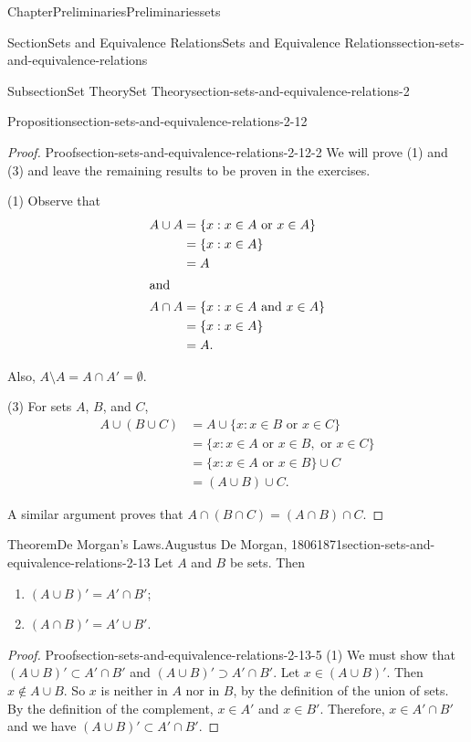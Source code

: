 \documentclass[oneside,10pt,]{book}
\numberwithin{equation}{section}
\begin{document}
\begin{chapterptx}{Chapter}{Preliminaries}{}{Preliminaries}{}{}{sets}
\begin{sectionptx}{Section}{Sets and Equivalence Relations}{}{Sets and Equivalence Relations}{}{}{section-sets-and-equivalence-relations}
\begin{subsectionptx}{Subsection}{Set Theory}{}{Set Theory}{}{}{section-sets-and-equivalence-relations-2}
\begin{proposition}{Proposition}{}{}{section-sets-and-equivalence-relations-2-12}
\begin{enumerate}
\end{enumerate}
%
\end{proposition}
\begin{proof}{Proof}{}{section-sets-and-equivalence-relations-2-12-2}
We will prove (1) and (3) and leave the remaining results to be proven in the exercises.%
\par
(1) Observe that%
\begin{align*}
A \cup A & =  \{ x :  x \in A \text{ or } x \in A \}\\
& =  \{ x : x \in A \}\\
& =  A\\
\intertext{and}
A \cap A & =  \{ x : x \in A \text{ and } x \in A \}\\
& =  \{ x : x \in A  \}\\
& =  A\text{.}
\end{align*}
%
\par
Also, \(A \setminus A = A \cap A' = \emptyset\).%
\par
(3) For sets \(A\), \(B\), and \(C\),%
\begin{align*}
A \cup (B \cup C) & = A \cup \{ x : x \in B \text{ or } x \in C \}\\
& = \{ x : x \in A \text{ or } x \in B, \text{ or } x \in C \}\\
& = \{ x : x \in A \text{ or } x \in B \} \cup C\\
& = (A \cup B) \cup C. 
\end{align*}
%
\par
A similar argument proves that  \(A \cap (B \cap C) = (A \cap B) \cap C\).%
\end{proof}
\begin{theorem}{Theorem}{De Morgan's Laws.}{Augustus De Morgan, 1806\textendash{}1871}{section-sets-and-equivalence-relations-2-13}%
%
Let \(A\) and \(B\) be sets. Then%
\begin{enumerate}
\item{}\((A \cup B)' = A' \cap B'\);%
\item{}\((A \cap B)' = A' \cup B'\).%
\end{enumerate}
%
\end{theorem}
\begin{proof}{Proof}{}{section-sets-and-equivalence-relations-2-13-5}
(1) We must show that \((A \cup B)' \subset A' \cap B'\) and \((A \cup B)' \supset A' \cap B'\). Let \(x \in (A \cup B)'\).  Then \(x \notin A \cup B\). So \(x\) is neither in \(A\) nor in \(B\), by the definition of the union of sets.  By the definition of the complement, \(x \in A'\) and \(x \in B'\).  Therefore, \(x \in A' \cap B'\) and we have \((A \cup B)' \subset A' \cap B'\).%

\end{proof}
\end{subsectionptx}
\end{sectionptx}
\end{chapterptx}
\end{document}
